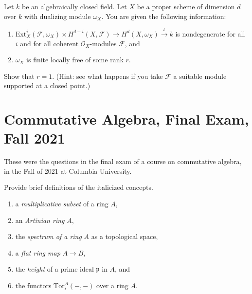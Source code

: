 \begin{exercise}
\label{exercise-dualizing-sheaf-rank-1}
Let $k$ be an algebraically closed field. Let $X$ be a proper scheme of
dimension $d$ over $k$ with dualizing module $\omega_X$.
You are given the following information:
\begin{enumerate}
\item $\text{Ext}^i_X(\mathcal{F}, \omega_X) \times
H^{d - i}(X, \mathcal{F}) \to H^d(X, \omega_X) \xrightarrow{t} k$
is nondegenerate for all $i$ and for all coherent $\mathcal{O}_X$-modules
$\mathcal{F}$, and
\item $\omega_X$ is finite locally free of some rank $r$.
\end{enumerate}
Show that $r = 1$. (Hint: see what happens if you take $\mathcal{F}$
a suitable module supported at a closed point.)
\end{exercise}







\section{Commutative Algebra, Final Exam, Fall 2021}
\label{section-final-exam-fall-2021}

\noindent
These were the questions in the final exam of a course on commutative algebra,
in the Fall of 2021 at Columbia University.

\begin{exercise}[Definitions]
\label{exercise-definitions-fall-2021}
Provide brief definitions of the italicized concepts.
\begin{enumerate}
\item a {\it multiplicative subset} of a ring $A$,
\item an {\it Artinian ring} $A$,
\item the {\it spectrum of a ring} $A$ as a topological space,
\item a {\it flat ring map} $A \to B$,
\item the {\it height} of a prime ideal $\mathfrak p$ in $A$, and
\item the functors {\it $\text{Tor}^A_i(-, -)$} over a ring $A$.
\end{enumerate}
\end{exercise}

